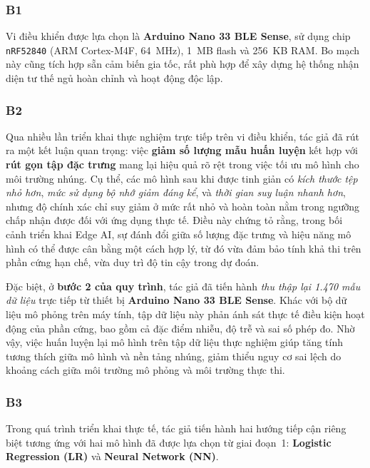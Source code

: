 \subsubsection{B1}

Vi điều khiển được lựa chọn là \textbf{Arduino Nano 33 BLE Sense}, sử dụng chip \texttt{nRF52840} (ARM Cortex-M4F, 64~MHz), 1~MB flash và 256~KB RAM. Bo mạch này cũng tích hợp sẵn cảm biến gia tốc, rất phù hợp để xây dựng hệ thống nhận diện tư thế ngủ hoàn chỉnh và hoạt động độc lập.

\subsubsection{B2}

Qua nhiều lần triển khai thực nghiệm trực tiếp trên vi điều khiển, 
tác giả đã rút ra một kết luận quan trọng: 
việc \textbf{giảm số lượng mẫu huấn luyện} kết hợp với \textbf{rút gọn tập đặc trưng} 
mang lại hiệu quả rõ rệt trong việc tối ưu mô hình cho môi trường nhúng. 
Cụ thể, các mô hình sau khi được tinh giản có \emph{kích thước tệp nhỏ hơn}, 
\emph{mức sử dụng bộ nhớ giảm đáng kể}, và \emph{thời gian suy luận nhanh hơn}, 
nhưng độ chính xác chỉ suy giảm ở mức rất nhỏ và hoàn toàn nằm trong ngưỡng chấp nhận được đối với ứng dụng thực tế. 
Điều này chứng tỏ rằng, trong bối cảnh triển khai Edge AI, 
sự đánh đổi giữa số lượng đặc trưng và hiệu năng mô hình có thể được cân bằng một cách hợp lý, 
từ đó vừa đảm bảo tính khả thi trên phần cứng hạn chế, vừa duy trì độ tin cậy trong dự đoán.  

Đặc biệt, ở \textbf{bước 2 của quy trình}, tác giả đã tiến hành \emph{thu thập lại 1.470 mẫu dữ liệu} 
trực tiếp từ thiết bị \textbf{Arduino Nano 33 BLE Sense}. 
Khác với bộ dữ liệu mô phỏng trên máy tính, tập dữ liệu này phản ánh sát thực tế điều kiện hoạt động của phần cứng, 
bao gồm cả đặc điểm nhiễu, độ trễ và sai số phép đo. 
Nhờ vậy, việc huấn luyện lại mô hình trên tập dữ liệu thực nghiệm giúp tăng tính tương thích giữa mô hình và nền tảng nhúng, 
giảm thiểu nguy cơ sai lệch do khoảng cách giữa môi trường mô phỏng và môi trường thực thi.  

\subsubsection{B3}
Trong quá trình triển khai thực tế, tác giả tiến hành hai hướng tiếp cận riêng biệt 
tương ứng với hai mô hình đã được lựa chọn từ giai đoạn~1: \textbf{Logistic Regression (LR)} và \textbf{Neural Network (NN)}.  

